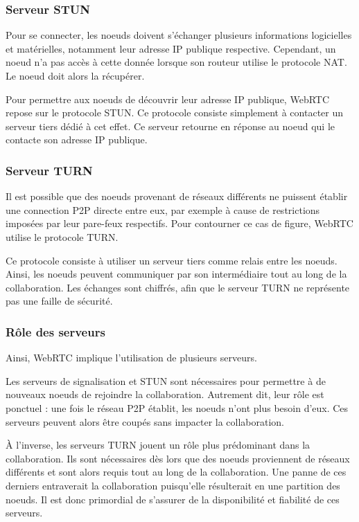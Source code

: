 \documentclass[12pt]{thesul}
\begin{document}
\subsubsection{Serveur STUN}

Pour se connecter, les noeuds doivent s'échanger plusieurs informations logicielles et matérielles, notamment leur adresse IP publique respective.
Cependant, un noeud n'a pas accès à cette donnée lorsque son routeur utilise le protocole NAT.
Le noeud doit alors la récupérer.

Pour permettre aux noeuds de découvrir leur adresse IP publique, \ac{WebRTC} repose sur le protocole STUN.
Ce protocole consiste simplement à contacter un serveur tiers dédié à cet effet.
Ce serveur retourne en réponse au noeud qui le contacte son adresse IP publique.

\subsubsection{Serveur TURN}

Il est possible que des noeuds provenant de réseaux différents ne puissent établir une connection \ac{P2P} directe entre eux, par exemple à cause de restrictions imposées par leur pare-feux respectifs.
Pour contourner ce cas de figure, \ac{WebRTC} utilise le protocole TURN.

Ce protocole consiste à utiliser un serveur tiers comme relais entre les noeuds.
Ainsi, les noeuds peuvent communiquer par son intermédiaire tout au long de la collaboration.
Les échanges sont chiffrés, afin que le serveur TURN ne représente pas une faille de sécurité.

\subsubsection{Rôle des serveurs}

Ainsi, \ac{WebRTC} implique l'utilisation de plusieurs serveurs.

Les serveurs de signalisation et STUN sont nécessaires pour permettre à de nouveaux noeuds de rejoindre la collaboration.
Autrement dit, leur rôle est ponctuel : une fois le réseau \ac{P2P} établit, les noeuds n'ont plus besoin d'eux.
Ces serveurs peuvent alors être coupés sans impacter la collaboration.

À l'inverse, les serveurs TURN jouent un rôle plus prédominant dans la collaboration.
Ils sont nécessaires dès lors que des noeuds proviennent de réseaux différents et sont alors requis tout au long de la collaboration.
Une panne de ces derniers entraverait la collaboration puisqu'elle résulterait en une partition des noeuds.
Il est donc primordial de s'assurer de la disponibilité et fiabilité de ces serveurs.
\end{document}
